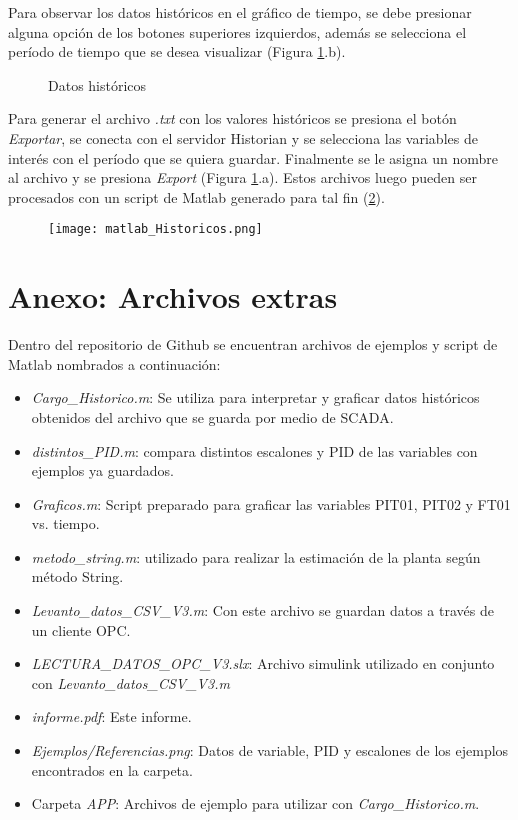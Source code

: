Para observar los datos históricos en el gráfico de tiempo, se debe presionar alguna opción de los botones superiores izquierdos, además se selecciona el período de tiempo que se desea visualizar (Figura \ref{fig:scada3a3}.b).


\begin{figure}[h!]
	\centering
	\caption{Datos históricos} \label{fig:scada3a3}
\end{figure}

Para generar el archivo \textit{.txt} con los valores históricos se presiona el botón \textit{Exportar}, se conecta con el servidor Historian y se selecciona las variables de interés con el período que se quiera guardar.
Finalmente se le asigna un nombre al archivo y se presiona \textit{Export} (Figura \ref{fig:scada3a3}.a).
Estos archivos luego pueden ser procesados con un script de Matlab generado para tal fin (\ref{fig:matlabH}).


\begin{figure}[h!]
	\centering
	\texttt{[image: matlab\_Historicos.png]}
	\label{fig:matlabH}
\end{figure}

\clearpage
\newpage

\section{Anexo: Archivos extras}
Dentro del repositorio de Github  se encuentran archivos de ejemplos y script de Matlab nombrados a continuación:
\begin{itemize}
	\item \textit{Cargo\_Historico.m}: Se utiliza para interpretar y graficar datos históricos obtenidos del archivo que se guarda por medio de SCADA.
	\item \textit{distintos\_PID.m}: compara distintos escalones y PID de las variables con ejemplos ya guardados.
	\item \textit{Graficos.m}: Script preparado para graficar las variables PIT01, PIT02 y FT01 vs. tiempo.
	\item \textit{metodo\_string.m}: utilizado para realizar la estimación de la planta según método String.
	\item \textit{Levanto\_datos\_CSV\_V3.m}: Con este archivo se guardan datos a través de un cliente OPC.
	\item \textit{LECTURA\_DATOS\_OPC\_V3.slx}:	Archivo simulink utilizado en conjunto con \textit{Levanto\_datos\_CSV\_V3.m}
	\item \textit{informe.pdf}: Este informe.
	\item \textit{Ejemplos/Referencias.png}: Datos de variable, PID y escalones de los ejemplos encontrados en la carpeta.
	\item Carpeta \textit{APP}: Archivos de ejemplo para utilizar con \textit{Cargo\_Historico.m}.
\end{itemize}
